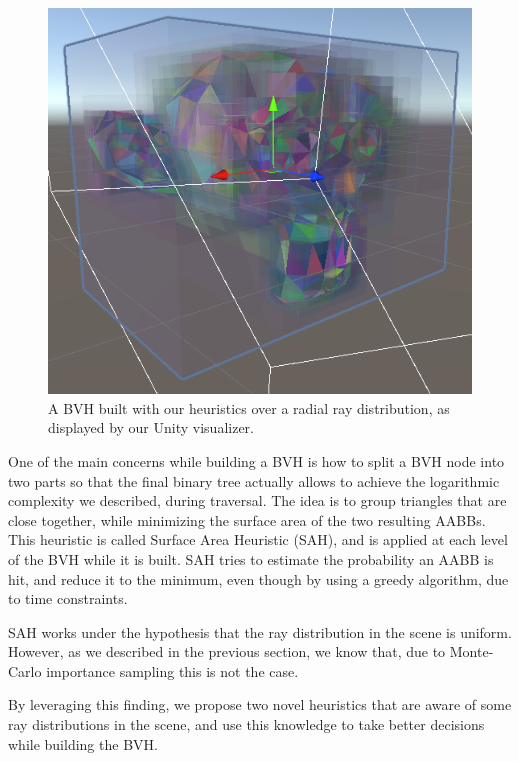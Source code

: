 \documentclass{PoliMi_MasterThesis}
\begin{document}
\begin{figure}[]
    \centering
    \includegraphics[width=\textwidth*\real{0.55}]{Images/suzanne_visualizer.png}
    \caption{A BVH built with our heuristics over a radial ray distribution, as displayed by our Unity visualizer.}
    \label{fig:suzanne_intro}
\end{figure}

One of the main concerns while building a BVH is how to split a BVH node into two parts so that the final binary tree actually allows to achieve the logarithmic complexity we described, during traversal. The idea is to group triangles that are close together, while minimizing the surface area of the two resulting AABBs. This heuristic is called Surface Area Heuristic (SAH), and is applied at each level of the BVH while it is built. SAH tries to estimate the probability an AABB is hit, and reduce it to the minimum, even though by using a greedy algorithm, due to time constraints.

SAH works under the hypothesis that the ray distribution in the scene is uniform. However, as we described in the previous section, we know that, due to Monte-Carlo importance sampling this is not the case.

By leveraging this finding, we propose two novel heuristics that are aware of some ray distributions in the scene, and use this knowledge to take better decisions while building the BVH.
\end{document}
